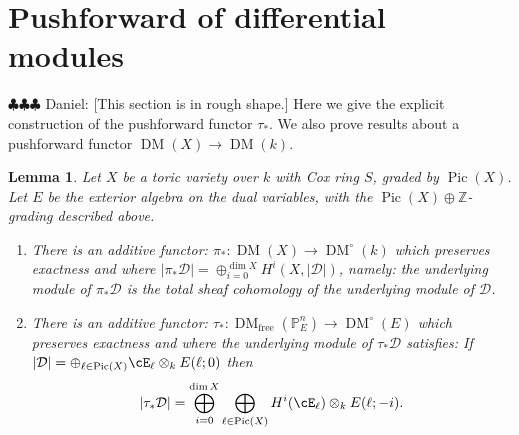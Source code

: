 \documentclass[12pt]{amsart}
\newtheorem{lemma}{Lemma}[section]
\theoremstyle{definition}
\theoremstyle{remark}
\newcommand{\PP}{\mathbb P}
\newcommand{\ZZ}{\mathbb Z}
\newcommand{\Pic}{\operatorname{Pic}}
\newcommand{\daniel}[1]{{\color{blue} \sf $\clubsuit\clubsuit\clubsuit$ Daniel: [#1]}}
\def\DM{\operatorname{DM}}
\def\free{\operatorname{free}}
\begin{document}
\section{Pushforward of differential modules}\label{sec:tau}
\daniel{This section is in rough shape.}
Here we give the explicit construction of the pushforward functor $\tau_*$.  We also prove results about a pushforward functor $\DM(X)\to \DM(k)$.
\begin{lemma}\label{lemma:tau}
Let $X$ be a toric variety over $k$ with Cox ring $S$, graded by $\Pic(X)$.  Let $E$ be the exterior algebra on the dual variables, with the $\Pic(X)\oplus \ZZ$-grading described above.
\begin{enumerate}
	\item There is an additive functor: $\pi_*\colon \DM(X)\to \DM^\circ (k)$ which preserves exactness and where $|\pi_* \mathcal D| =\oplus_{i=0}^{\dim X} H^i(X, |\mathcal D|)$, namely: the underlying module of $\pi_* \mathcal D$ is the total sheaf cohomology of the underlying module of $\mathcal D$.
	\item There is an additive functor: $\tau_*\colon \DM_{\free}(\PP^n_E)\to \DM^\circ(E)$ which preserves exactness and where the underlying module of $\tau_*\mathcal D$ satisfies: If $|\mathcal D| =\oplus_{\ell\in \Pic(X)} \cE_\ell\otimes_k E(\ell;0)$ then
	\begin{equation}\label{eqn:underlying module}
	 |\tau_*\mathcal D| =\bigoplus_{i=0}^{\dim X}\bigoplus_{\ell\in \Pic(X)} H^i(\cE_\ell)\otimes_k E(\ell;-i).
	 \end{equation}
	\end{enumerate}
\end{lemma}
\end{document}

